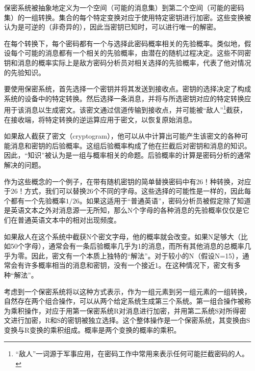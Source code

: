 \documentclass[]{article}
\begin{document}
保密系统被抽象地定义为一个空间（可能的消息集）到第二个空间（可能的密码集）的一组转换。集合的每个特定变换对应于使用特定密钥进行加密。这些变换被认为是可逆的（非奇异的），因此当密钥已知时，可以进行唯一的解密。\par

在每个转换下，每个密码都有一个与选择此密码概率相关的先验概率。类似地，假设每个可能的消息都有一个相关的先验概率，由潜在的随机过程决定。这些不同密钥和消息的概率实际上是敌方密码分析员对相关选择的先验概率，代表了他对情况的先验知识。\par

要使用保密系统，首先选择一个密钥并将其发送到接收点。密钥的选择决定了构成系统的设备中的特定转换。然后选择一条消息，并将与所选密钥对应的特定转换应用于该消息以生成密文。该密文通过信道传输到接收点，并可能被“敌人”\footnote{“敌人”一词源于军事应用，在密码工作中常用来表示任何可能拦截密码的人。}截获，在接收端，将特定转换的逆运算应用于密文，以恢复原始消息。\par

如果敌人截获了密文（cryptogram），他可以从中计算出可能产生该密文的各种可能消息和密钥的后验概率。这组后验概率构成了他在拦截后对密钥和消息的知识。因此，“知识”被认为是一组与概率相关的命题。后验概率的计算是密码分析的通常解决的问题。
\par

作为这些概念的一个例子，在带有随机密钥的简单替换密码中有26！种转换，对应于26！方式，我们可以替换26个不同的字母。这些选择的可能性是一样的，因此每个都有一个先验概率$1/26$。如果这适用于“普通英语”，密码分析员被假定除了知道是英语文本之外对消息源一无所知，那么N个字母的各种消息的先验概率仅仅是它们在普通英语文本中的相对出现频度。\par

如果敌人在这个系统中截获N个密文字母，他的概率就会改变。如果N足够大（比如50个字母），通常会有一条后验概率几乎为1的消息，而所有其他消息的总概率几乎为零。因此，密文有一个本质上独特的“解法”。对于较小的N（假设N=15），通常会有许多概率相当的消息和密钥，没有一个接近1。在这种情况下，密文有多种“解法”。\par

考虑到一个保密系统将以这种方式表示，作为一组元素到另一组元素的一组转换，自然存在两个组合操作，可以从两个给定系统生成第三个系统。第一组合操作被称为乘积操作，对应于用第一保密系统R对消息进行加密，并用第二系统S对所得密文进行加密，R和S的密钥被独立选择。这个整体操作是一个保密系统，其变换由S变换与R变换的乘积组成。概率是两个变换的概率的乘积。

	
	
\end{document}
